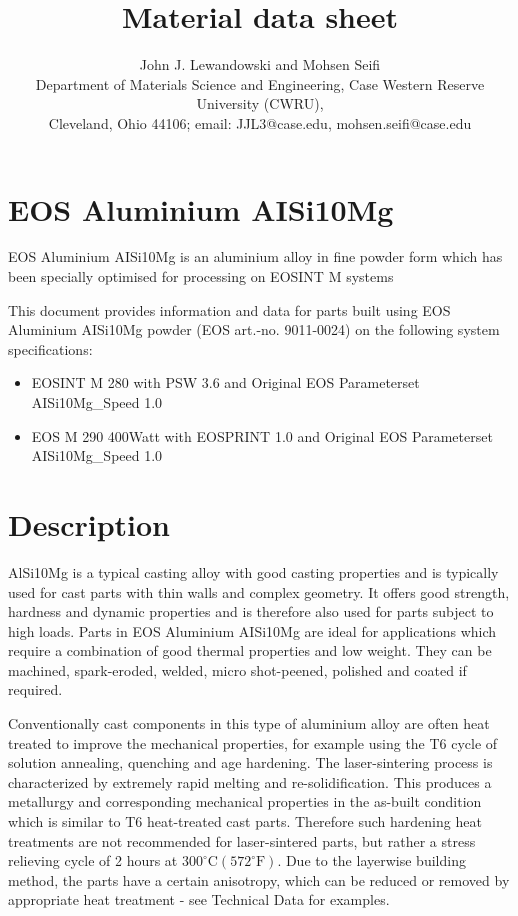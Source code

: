 \documentclass[10pt]{article}
\title{Material data sheet }
\author{John J. Lewandowski and Mohsen Seifi\\
Department of Materials Science and Engineering, Case Western Reserve University (CWRU),\\
Cleveland, Ohio 44106; email: JJL3@case.edu, mohsen.seifi@case.edu}
\date{}
\begin{document}
\maketitle
\section*{EOS Aluminium AISi10Mg}
EOS Aluminium AISi10Mg is an aluminium alloy in fine powder form which has been specially optimised for processing on EOSINT M systems

This document provides information and data for parts built using EOS Aluminium AISi10Mg powder (EOS art.-no. 9011-0024) on the following system specifications:

\begin{itemize}
  \item EOSINT M 280 with PSW 3.6 and Original EOS Parameterset AISi10Mg\_Speed 1.0
  \item EOS M 290 400Watt with EOSPRINT 1.0 and Original EOS Parameterset AISi10Mg\_Speed 1.0
\end{itemize}

\section*{Description}
AlSi10Mg is a typical casting alloy with good casting properties and is typically used for cast parts with thin walls and complex geometry. It offers good strength, hardness and dynamic properties and is therefore also used for parts subject to high loads. Parts in EOS Aluminium AISi10Mg are ideal for applications which require a combination of good thermal properties and low weight. They can be machined, spark-eroded, welded, micro shot-peened, polished and coated if required.

Conventionally cast components in this type of aluminium alloy are often heat treated to improve the mechanical properties, for example using the T6 cycle of solution annealing, quenching and age hardening. The laser-sintering process is characterized by extremely rapid melting and re-solidification. This produces a metallurgy and corresponding mechanical properties in the as-built condition which is similar to T6 heat-treated cast parts. Therefore such hardening heat treatments are not recommended for laser-sintered parts, but rather a stress relieving cycle of 2 hours at $300^{\circ} \mathrm{C}\left(572^{\circ} \mathrm{F}\right)$. Due to the layerwise building method, the parts have a certain anisotropy, which can be reduced or removed by appropriate heat treatment - see Technical Data for examples.
\end{document}
